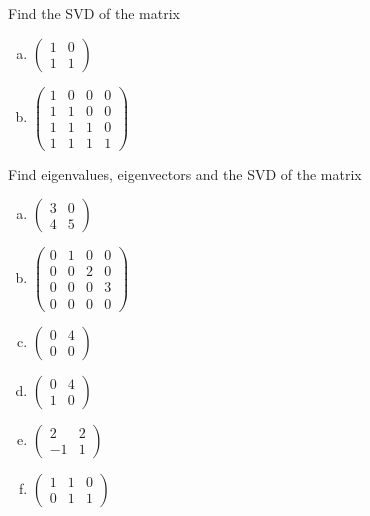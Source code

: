 \begin{problem}
Find the SVD of the matrix
\begin{enumerate}[a) ]
\item
$\begin{pmatrix}
    1 & 0 \\
    1 & 1
    \end{pmatrix}$
\item
$\begin{pmatrix}
        1 & 0 & 0 & 0 \\
        1 & 1 & 0 & 0 \\
        1 & 1 & 1 & 0 \\
        1 & 1 & 1 & 1
        \end{pmatrix}$
\end{enumerate}
\end{problem}

\begin{problem}
Find eigenvalues, eigenvectors and the SVD of the matrix
\begin{enumerate}[a) ]
\item $\begin{pmatrix}
    3 & 0 \\
    4 & 5
    \end{pmatrix}$
\item $\begin{pmatrix}
        0 & 1 & 0 & 0 \\
        0 & 0 & 2 & 0 \\
        0 & 0 & 0 & 3 \\
        0 & 0 & 0 & 0
        \end{pmatrix}$
\item $\begin{pmatrix}
            0 & 4 \\
            0 & 0
            \end{pmatrix}$
\item $\begin{pmatrix}
            0 & 4 \\
            1 & 0
            \end{pmatrix}$
\item $\begin{pmatrix}
                2 & 2 \\
                -1 & 1
                \end{pmatrix}$
\item $\begin{pmatrix}
                    1 & 1 & 0 \\
                    0 & 1 & 1
                    \end{pmatrix}$
\end{enumerate}
\end{problem}

